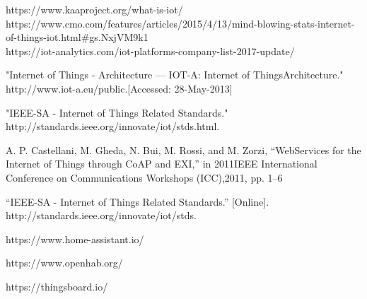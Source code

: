\documentclass[runningheads,a4paper]{llncs}
\begin{document}
\begin{thebibliography}{4}

 https://www.kaaproject.org/what-is-iot/ \\

 https://www.cmo.com/features/articles/2015/4/13/mind-blowing-stats-internet-of-things-iot.html\#gs.NxjVM9k1 \\

 https://iot-analytics.com/iot-platforms-company-list-2017-update/

 "Internet of Things - Architecture — IOT-A: Internet of ThingsArchitecture."    http://www.iot-a.eu/public.[Accessed: 28-May-2013]

 "IEEE-SA - Internet of Things Related Standards." http://standards.ieee.org/innovate/iot/stds.html.         

 A. P. Castellani, M. Gheda, N. Bui, M. Rossi, and M. Zorzi, “WebServices for the Internet of Things through CoAP and EXI,” in 2011IEEE International Conference on Communications Workshops (ICC),2011, pp. 1–6

 “IEEE-SA - Internet of Things Related Standards.” [Online]. http://standards.ieee.org/innovate/iot/stds.

 https://www.home-assistant.io/

 https://www.openhab.org/

 https://thingsboard.io/


\end{thebibliography}
\end{document}
